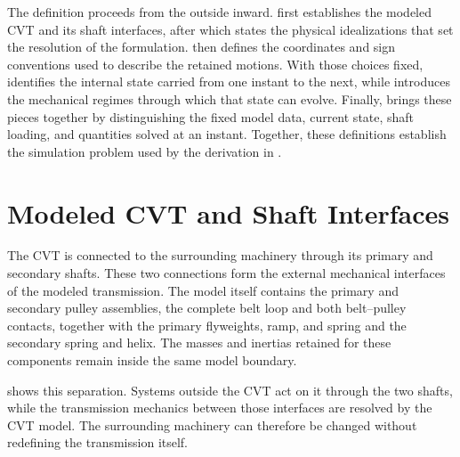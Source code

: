 \documentclass[11pt]{report}
\numberwithin{equation}{section}
\newcounter{assump}
\begin{document}
The definition proceeds from the outside inward. 
first establishes the modeled CVT and its shaft interfaces, after which
 states the physical idealizations that set the
resolution of the formulation.  then
defines the coordinates and sign conventions used to describe the retained
motions. With those choices fixed,
 identifies the internal state carried
from one instant to the next, while
 introduces the mechanical
regimes through which that state can evolve. Finally,
 brings these pieces together by distinguishing
the fixed model data, current state, shaft loading, and quantities solved at an
instant. Together, these definitions establish the simulation problem used by
the derivation in .


\section{Modeled CVT and Shaft Interfaces}
\label{sec:system_definition}

The CVT is connected to the surrounding machinery through its primary and
secondary shafts. These two connections form the external mechanical
interfaces of the modeled transmission. The model itself contains the primary
and secondary pulley assemblies, the complete belt loop and both
belt--pulley contacts, together with the primary flyweights, ramp, and spring
and the secondary spring and helix. The masses and inertias retained for these
components remain inside the same model boundary.

 shows this separation. Systems outside the CVT
act on it through the two shafts, while the transmission mechanics between
those interfaces are resolved by the CVT model. The surrounding machinery can
therefore be changed without redefining the transmission itself.
\end{document}
